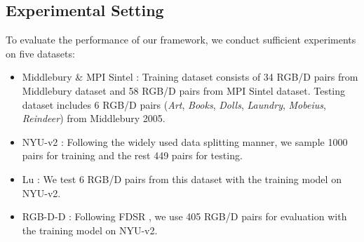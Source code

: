\documentclass[letterpaper]{article} %
\begin{document}
\subsection{Experimental Setting}
To evaluate the performance of our framework, we conduct sufficient experiments on five datasets:
\begin{itemize}\setlength{\itemsep}{0pt} 
    \item Middlebury \cite{hirschmuller2007evaluation} \&  MPI Sintel \cite{butler2012naturalistic}: Training dataset consists of 34 RGB/D pairs from Middlebury dataset and 58 RGB/D pairs from MPI Sintel dataset. Testing dataset includes 6 RGB/D pairs (\textit{Art}, \textit{Books}, \textit{Dolls}, \textit{Laundry}, \textit{Mobeius}, \textit{Reindeer}) from Middlebury 2005.
    \item NYU-v2 \cite{silberman2012indoor}: Following the widely used data splitting manner, we sample 1000 pairs for training and the rest 449 pairs for testing. 
    \item Lu \cite{lu2014depth}: We test 6 RGB/D pairs from this dataset with the training model on NYU-v2.
    \item RGB-D-D \cite{he2021towards}: Following FDSR \cite{he2021towards}, we use 405 RGB/D pairs for evaluation  with the training model on NYU-v2. 
\end{itemize}
\end{document}
